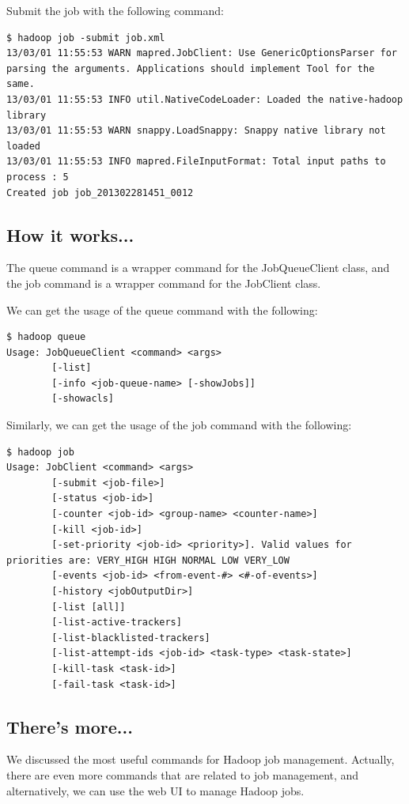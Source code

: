 Submit the job with the following command:
\lstset{style=bashstyle}
\begin{lstlisting}
$ hadoop job -submit job.xml
13/03/01 11:55:53 WARN mapred.JobClient: Use GenericOptionsParser for parsing the arguments. Applications should implement Tool for the same.
13/03/01 11:55:53 INFO util.NativeCodeLoader: Loaded the native-hadoop library
13/03/01 11:55:53 WARN snappy.LoadSnappy: Snappy native library not loaded
13/03/01 11:55:53 INFO mapred.FileInputFormat: Total input paths to process : 5
Created job job_201302281451_0012
\end{lstlisting}
\subsection*{How it works...}
The queue command is a wrapper command for the JobQueueClient class, and the job command is a wrapper command for the JobClient class.

We can get the usage of the queue command with the following:
\lstset{style=bashstyle}
\begin{lstlisting}
$ hadoop queue
Usage: JobQueueClient <command> <args>
        [-list]
        [-info <job-queue-name> [-showJobs]]
        [-showacls]
\end{lstlisting}

Similarly, we can get the usage of the job command with the following: 
\lstset{style=bashstyle}
\begin{lstlisting}
$ hadoop job
Usage: JobClient <command> <args>
        [-submit <job-file>]
        [-status <job-id>]
        [-counter <job-id> <group-name> <counter-name>]
        [-kill <job-id>]
        [-set-priority <job-id> <priority>]. Valid values for priorities are: VERY_HIGH HIGH NORMAL LOW VERY_LOW
        [-events <job-id> <from-event-#> <#-of-events>]
        [-history <jobOutputDir>]
        [-list [all]]
        [-list-active-trackers]
        [-list-blacklisted-trackers]
        [-list-attempt-ids <job-id> <task-type> <task-state>]
        [-kill-task <task-id>]
        [-fail-task <task-id>]
\end{lstlisting}
\subsection*{There's more...}
We discussed the most useful commands for Hadoop job management. Actually, there are even more commands that are related to job management, and alternatively, we can use the web UI to manage Hadoop jobs.

